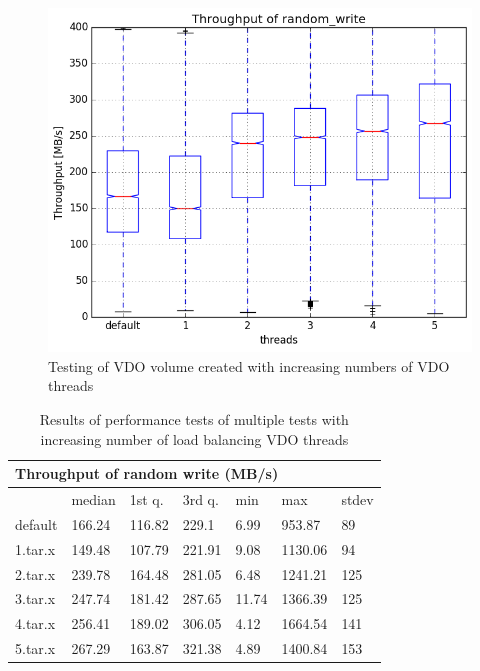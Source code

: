 \documentclass[
  color, %
  table, %
  lof,   %
  lot,   %
]{fithesis3}
\begin{document}
\begin{figure}[!htb]
        \centering
        \includegraphics[width=\textwidth]{../results/threads/direct/low_res/random_write1_compare_boxplots}
\caption[Tuning performance by increasing number of VDO threads]{Testing of VDO volume created with increasing numbers of VDO threads}
\label{fig:threads-all}
\end{figure}

\begin{table}
\begin{tabular}{|l|l|l|l|l|l|l|}
        \hline
        \multicolumn{7}{|l|}{Throughput of random write (MB/s)} \\ \hline
        & median & 1st q. & 3rd q. & min & max & stdev \\ \hline 
default & 166.24 & 116.82 & 229.1 & 6.99 & 953.87 & 89 \\ \hline
1.tar.x & 149.48 & 107.79 & 221.91 & 9.08 & 1130.06 & 94 \\ \hline
2.tar.x & 239.78 & 164.48 & 281.05 & 6.48 & 1241.21 & 125 \\ \hline
3.tar.x & 247.74 & 181.42 & 287.65 & 11.74 & 1366.39 & 125 \\ \hline
4.tar.x & 256.41 & 189.02 & 306.05 & 4.12 & 1664.54 & 141 \\ \hline
5.tar.x & 267.29 & 163.87 & 321.38 & 4.89 & 1400.84 & 153 \\ \hline
\end{tabular}
\caption[Tuning performance by increasing number of VDO threads]{Results of performance tests of multiple tests with increasing number of load balancing VDO threads}
\label{tab:tuning}
\end{table}
\end{document}
